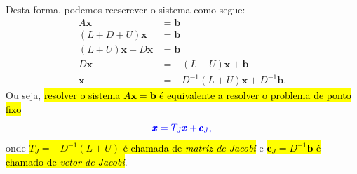Desta forma, podemos reescrever o sistema como segue:
\begin{align}
  A\pmb{x} &= \pmb{b}\\
  (L + D + U)\pmb{x} &= \pmb{b}\\
  (L + U)\pmb{x} + D\pmb{x} &= \pmb{b}\\
  D\pmb{x} &= -(L+U)\pmb{x} + \pmb{b}\\
  \pmb{x} &= -D^{-1}(L+U)\pmb{x} + D^{-1}\pmb{b}.
\end{align}
Ou seja, \hl{resolver o sistema $A\pmb{x} = \pmb{b}$ é equivalente a resolver o problema de ponto fixo}
\begin{equation}
  \color{blue}\pmb{x} = T_J\pmb{x} + \pmb{c}_J,
\end{equation}
onde \hl{$T_J = -D^{-1}(L+U)$ é chamada de \emph{matriz de Jacobi}} e \hl{$\pmb{c}_J = D^{-1}\pmb{b}$ é chamado de \emph{vetor de Jacobi}}.

